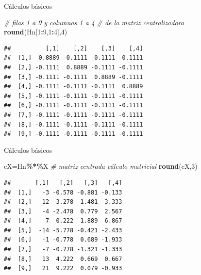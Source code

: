 \documentclass[
  ignorenonframetext,
]{beamer}
\newenvironment{Shaded}{\begin{snugshade}}{\end{snugshade}}
\newcommand{\CommentTok}[1]{\textcolor[rgb]{0.56,0.35,0.01}{\textit{#1}}}
\newcommand{\DecValTok}[1]{\textcolor[rgb]{0.00,0.00,0.81}{#1}}
\newcommand{\FunctionTok}[1]{\textcolor[rgb]{0.13,0.29,0.53}{\textbf{#1}}}
\newcommand{\NormalTok}[1]{#1}
\newcommand{\OtherTok}[1]{\textcolor[rgb]{0.56,0.35,0.01}{#1}}
\newcommand{\SpecialCharTok}[1]{\textcolor[rgb]{0.81,0.36,0.00}{\textbf{#1}}}
\begin{document}
\begin{frame}[fragile]{Cálculos básicos}
\label{cuxe1lculos-buxe1sicos-2}
\begin{Shaded}
\begin{Highlighting}[]
\CommentTok{\# filas 1 a 9 y columnas 1 a 4 }
\CommentTok{\# de la matriz centralizadora}
\FunctionTok{round}\NormalTok{(Hn[}\DecValTok{1}\SpecialCharTok{:}\DecValTok{9}\NormalTok{,}\DecValTok{1}\SpecialCharTok{:}\DecValTok{4}\NormalTok{],}\DecValTok{4}\NormalTok{)}
\end{Highlighting}
\end{Shaded}

\begin{verbatim}
##          [,1]    [,2]    [,3]    [,4]
##  [1,]  0.8889 -0.1111 -0.1111 -0.1111
##  [2,] -0.1111  0.8889 -0.1111 -0.1111
##  [3,] -0.1111 -0.1111  0.8889 -0.1111
##  [4,] -0.1111 -0.1111 -0.1111  0.8889
##  [5,] -0.1111 -0.1111 -0.1111 -0.1111
##  [6,] -0.1111 -0.1111 -0.1111 -0.1111
##  [7,] -0.1111 -0.1111 -0.1111 -0.1111
##  [8,] -0.1111 -0.1111 -0.1111 -0.1111
##  [9,] -0.1111 -0.1111 -0.1111 -0.1111
\end{verbatim}
\end{frame}

\begin{frame}[fragile]{Cálculos básicos}
\label{cuxe1lculos-buxe1sicos-3}
\begin{Shaded}
\begin{Highlighting}[]
\NormalTok{cX}\OtherTok{=}\NormalTok{Hn}\SpecialCharTok{\%*\%}\NormalTok{X }\CommentTok{\# matriz centrada cálculo matricial}
\FunctionTok{round}\NormalTok{(cX,}\DecValTok{3}\NormalTok{)}
\end{Highlighting}
\end{Shaded}

\begin{verbatim}
##       [,1]   [,2]   [,3]   [,4]
##  [1,]   -3 -0.578 -0.881 -0.133
##  [2,]  -12 -3.278 -1.481 -3.333
##  [3,]   -4 -2.478  0.779  2.567
##  [4,]    7  0.222  1.889  6.867
##  [5,]  -14 -5.778 -0.421 -2.433
##  [6,]   -1 -0.778  0.689 -1.933
##  [7,]   -7 -0.778 -1.321 -1.333
##  [8,]   13  4.222  0.669  0.667
##  [9,]   21  9.222  0.079 -0.933
\end{verbatim}
\end{frame}
\end{document}
